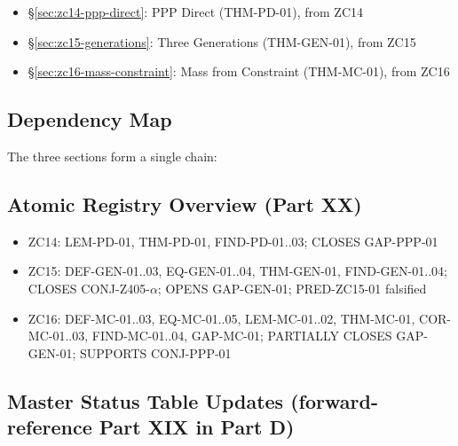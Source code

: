 \documentclass[12pt, a4paper]{article}
\begin{document}
\begin{itemize}[leftmargin=2em]
\item \S\ref{sec:zc14-ppp-direct}: PPP Direct (THM-PD-01), from ZC14
\item \S\ref{sec:zc15-generations}: Three Generations (THM-GEN-01), from ZC15
\item \S\ref{sec:zc16-mass-constraint}: Mass from Constraint (THM-MC-01), from ZC16
\end{itemize}

\subsection*{Dependency Map}

The three sections form a single chain:
\begin{center}
\end{center}

\subsection*{Atomic Registry Overview (Part XX)}

\begin{itemize}[leftmargin=*, noitemsep]
\item ZC14: LEM-PD-01, THM-PD-01, FIND-PD-01..03; CLOSES GAP-PPP-01
\item ZC15: DEF-GEN-01..03, EQ-GEN-01..04, THM-GEN-01, FIND-GEN-01..04;
  CLOSES CONJ-Z405-$\alpha$; OPENS GAP-GEN-01; PRED-ZC15-01 falsified
\item ZC16: DEF-MC-01..03, EQ-MC-01..05, LEM-MC-01..02, THM-MC-01,
  COR-MC-01..03, FIND-MC-01..04, GAP-MC-01;
  PARTIALLY CLOSES GAP-GEN-01; SUPPORTS CONJ-PPP-01
\end{itemize}

\subsection*{Master Status Table Updates (forward-reference Part XIX in Part D)}
\end{document}
